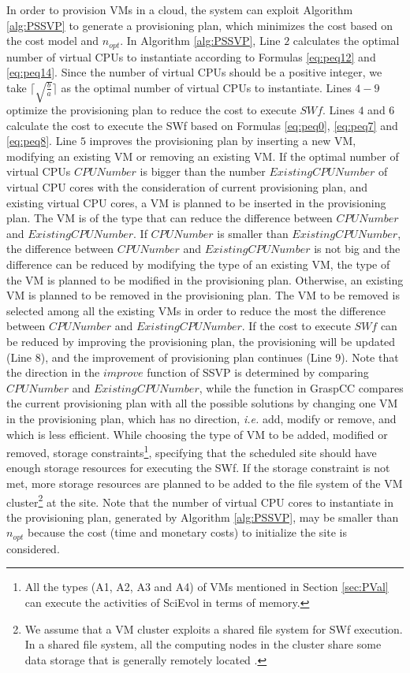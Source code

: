 In order to provision VMs in a cloud, the system can exploit Algorithm \ref{alg:PSSVP} to generate a provisioning plan, which minimizes the cost based on the cost model and $n_{opt}$. In Algorithm \ref{alg:PSSVP}, Line $2$ calculates the optimal number of virtual CPUs to instantiate according to Formulas \ref{eq:peq12} and \ref{eq:peq14}. Since the number of virtual CPUs should be a positive integer, we take $\lceil \sqrt{ \frac{b}{a} } \rceil$ as the optimal number of virtual CPUs to instantiate. Lines $4 - 9$ optimize the provisioning plan to reduce the cost to execute $SWf$. Lines $4$ and $6$ calculate the cost to execute the SWf based on Formulas \ref{eq:peq0}, \ref{eq:peq7} and \ref{eq:peq8}. Line $5$ improves the provisioning plan by inserting a new VM, modifying an existing VM or removing an existing VM. If the optimal number of virtual CPUs $CPUNumber$ is bigger than the number $ExistingCPUNumber$ of virtual CPU cores with the consideration of current provisioning plan, and existing virtual CPU cores, a VM is planned to be inserted in the provisioning plan. The VM is of the type that can reduce the difference between $CPUNumber$ and $ExistingCPUNumber$. If $CPUNumber$ is smaller than $ExistingCPUNumber$, the difference between $CPUNumber$ and $ExistingCPUNumber$ is not big and the difference can be reduced by modifying the type of an existing VM, the type of the VM is planned to be modified in the provisioning plan. Otherwise, 
an existing VM is planned to be removed in the provisioning plan. The VM to be removed is selected among all the existing VMs in order to reduce the most the difference between $CPUNumber$ and $ExistingCPUNumber$. If the cost to execute $SWf$ can be reduced by improving the provisioning plan, the provisioning will be updated (Line $8$), and the improvement of provisioning plan continues (Line $9$).
Note that the direction in the $improve$ function of SSVP is determined by comparing $CPUNumber$ and $ExistingCPUNumber$, while the function in GraspCC \cite{Coutinho2014} compares the current provisioning plan with all the possible solutions by changing one VM in the provisioning plan, which has no direction, \textit{i.e.} add, modify or remove, and which is less efficient.
While choosing the type of VM to be added, modified or removed, storage constraints\footnote{All the types (A1, A2, A3 and A4) of VMs mentioned in Section \ref{sec:PVal} can execute the activities of SciEvol in terms of memory.}, specifying that the scheduled site should have enough storage resources for executing the SWf. If the storage constraint is not met, more storage resources are planned to be added to the file system of the VM cluster\footnote{We assume that a VM cluster exploits a shared file system for SWf execution. In a shared file system, all the computing nodes in the cluster share some data storage that is generally remotely located \cite{Liu2014a}.} at the site.
Note that the number of virtual CPU cores to instantiate in the provisioning plan, generated by Algorithm \ref{alg:PSSVP}, may be smaller than $n_{opt}$ because the cost (time and monetary costs) to initialize the site is considered.

